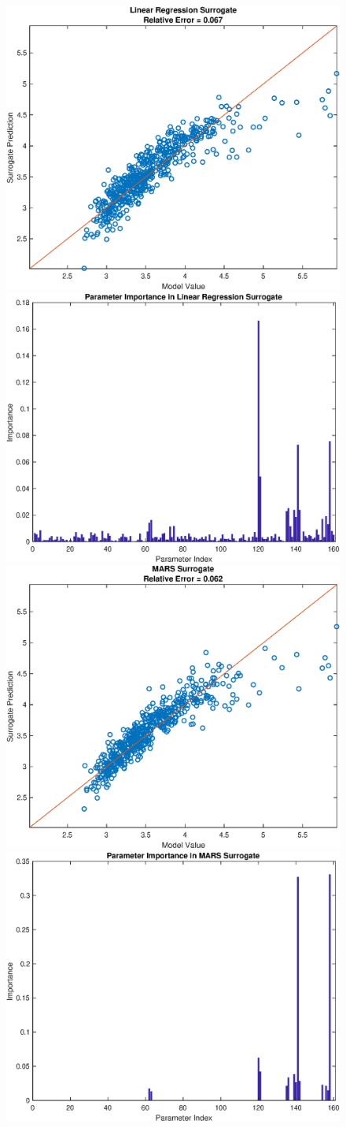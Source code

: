 \documentclass[12pt]{article}
\numberwithin{equation}{section}
\begin{document}
\begin{figure}[h]
\centering
\includegraphics[width=.49 \textwidth]{Figures/Vol_Flow_QoI_LR_Prediction_Experimental.eps}
\includegraphics[width=.49 \textwidth]{Figures/Vol_Flow_QoI_LR_VI_Experimental.eps}\\
\includegraphics[width=.49 \textwidth]{Figures/Vol_Flow_QoI_MARS_Prediction_Experimental.eps}
\includegraphics[width=.49 \textwidth]{Figures/Vol_Flow_QoI_MARS_VI_Experimental.eps}
\end{figure}
\end{document}
